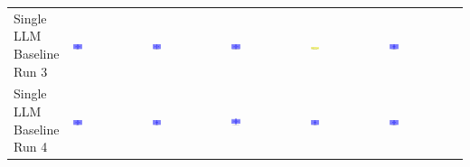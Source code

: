 \begin{table}
\begin{tabularx}{\textwidth}{@{}XXXXXX@{}}
    \makecell{Single LLM \\ Baseline \\ Run 3} & \includegraphics[width=0.13\textwidth]{./run_3/png/gpt-4o_results/BasicLayout.png} & \includegraphics[width=0.13\textwidth]{./run_3/png/o1-preview_results/BasicLayout.png} & \includegraphics[width=0.13\textwidth]{./run_3/png/claude-3-5-sonnet-20240620_results/BasicLayout.png} & \includegraphics[width=0.13\textwidth]{./run_3/png/watsonx_meta-llama_llama-3-1-70b-instruct_results/BasicLayout.png} & \includegraphics[width=0.13\textwidth]{./run_3/png/watsonx_meta-llama_llama-3-405b-instruct_results/BasicLayout.png} \\
    \makecell{Single LLM \\ Baseline \\ Run 4} & \includegraphics[width=0.13\textwidth]{./run_4/png/gpt-4o_results/BasicLayout.png} & \includegraphics[width=0.13\textwidth]{./run_4/png/o1-preview_results/BasicLayout.png} & \includegraphics[width=0.13\textwidth]{./run_4/png/claude-3-5-sonnet-20240620_results/BasicLayout.png} & \includegraphics[width=0.13\textwidth]{./run_4/png/watsonx_meta-llama_llama-3-1-70b-instruct_results/BasicLayout.png} & \includegraphics[width=0.13\textwidth]{./run_4/png/watsonx_meta-llama_llama-3-405b-instruct_results/BasicLayout.png} \\

\end{tabularx}
\end{table}
